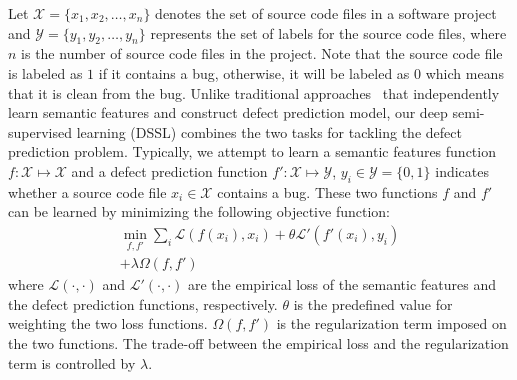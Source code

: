 Let $\mathcal{X}=\{x_1, x_2, \dots, x_n\}$ denotes the set of source code files in a software project and $\mathcal{Y}=\{y_1, y_2, \dots, y_n\}$ represents the set of labels for the source code files, where $n$ is the number of source code files in the project.  Note that the source code file is labeled as $1$ if it contains a bug, otherwise, it will be labeled as $0$ which means that it is clean from the bug. %
Unlike traditional approaches~\cite{yang2015deep, wang2016automatically} that independently learn semantic features and construct defect prediction model, our deep semi-supervised learning (DSSL) combines the two tasks for tackling the defect prediction problem. Typically, we attempt to learn a semantic features function $f: \mathcal{X} \longmapsto \mathcal{X}$ and a defect prediction function $f': \mathcal{X} \longmapsto \mathcal{Y}$, $y_i \in \mathcal{Y}=\{0, 1\}$ indicates whether a source code file $x_i \in \mathcal{X}$ contains a bug. %
These two functions $f$ and $f'$ can be learned by minimizing the following objective function:
\begin{equation}
\label{eq:loss}
\begin{split}
\min_{f,f'} \sum_{i}^{}\mathcal{L}(f(x_i), x_i) + \theta \mathcal{L'}(f'(x_i), y_i) \\
+ \lambda \Omega(f, f')
\end{split}
\end{equation}
where $\mathcal{L}(\cdot, \cdot)$ and $\mathcal{L}'(\cdot, \cdot)$ are the empirical loss of the semantic features and the defect prediction functions, respectively. $\theta$ is the predefined value for weighting the two loss functions. $\Omega(f, f')$ is the regularization term imposed on the two functions. The trade-off between the empirical loss and the regularization term is controlled by $\lambda$. 

